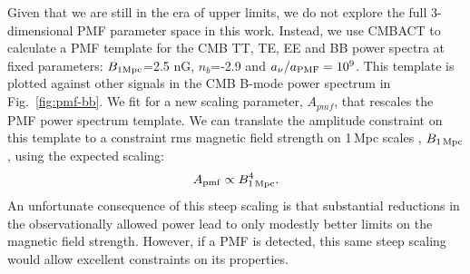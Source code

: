 \documentclass[apj]{emulateapj}
\newcommand{\apmf}{\ensuremath{A_{\rm pmf}}}
\newcommand{\bpmf}{\ensuremath{B_{\rm 1\,Mpc}}}
\newcommand{\be}{\begin{equation}}
\newcommand{\ee}{\end{equation}}
\begin{document}
Given that we are still in the era of upper limits,  we do not explore the full 3-dimensional PMF parameter space in this work. 
Instead, we use CMBACT to calculate a PMF template for the CMB TT, TE, EE and BB power spectra at fixed parameters: $B_{\rm{1Mpc}}$=2.5 \rm{nG}, $n_b$=-2.9 and $a_{\nu}/a_{\rm{PMF}}=10^9$. 
This template is plotted against other signals in the CMB B-mode power spectrum in Fig.~\ref{fig:pmf-bb}. 
We fit for a new scaling parameter, $A_{pmf}$, that rescales the PMF power spectrum template. 
We can translate the amplitude constraint on this template to a constraint rms magnetic field strength on 1\,Mpc scales , \bpmf, using the expected scaling:
\be
\apmf \propto \bpmf^4.
\ee
An unfortunate consequence of this steep scaling is that substantial reductions in the observationally allowed power lead to only modestly better limits on the magnetic field strength. 
However, if a PMF is detected, this same steep scaling would allow excellent constraints on its properties. 
\end{document}
